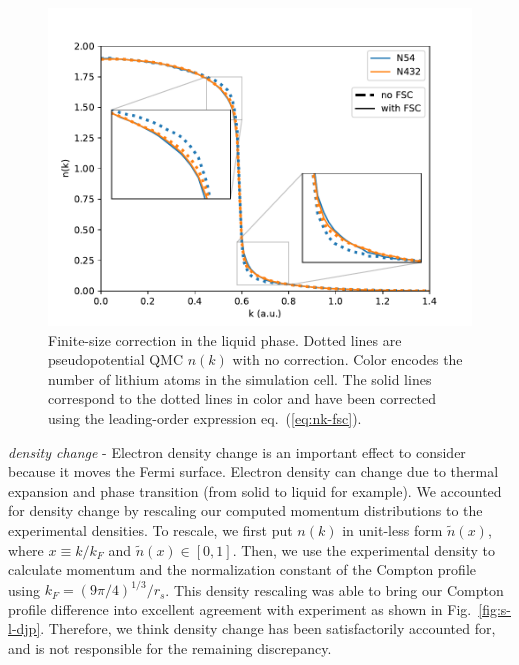 \documentclass[aps,prb,showpacs,preprintnumbers,amsmath,amssymb,superscriptaddress,twocolumn]{revtex4-1}
\begin{document}
\begin{figure}
\includegraphics[width=\linewidth]{li58h_liquid-fsc}
\caption{Finite-size correction in the liquid phase. Dotted lines are pseudopotential QMC $n(k)$ with no correction. Color encodes the number of lithium atoms in the simulation cell. The solid lines correspond to the dotted lines in color and have been corrected using the leading-order expression eq.~(\ref{eq:nk-fsc}). \label{fig:liquid-nk-fsc}}
\end{figure}

\emph{density change} - Electron density change is an important effect to consider because it moves the Fermi surface. Electron density can change due to thermal expansion and phase transition (from solid to liquid for example). 
We accounted for density change by rescaling our computed momentum distributions to the experimental densities. To rescale, we first put $n(k)$ in unit-less form $\tilde{n}(x)$, where $x\equiv k/k_F$ and $\tilde{n}(x)\in[0, 1]$. Then, we use the experimental density to calculate momentum and the normalization constant of the Compton profile using $k_F=(9\pi/4)^{1/3}/r_s$. This density rescaling was able to bring our Compton profile difference into excellent agreement with experiment as shown in Fig.~\ref{fig:s-l-djp}. Therefore, we think density change has been satisfactorily accounted for, and is not responsible for the remaining discrepancy.
\end{document}
